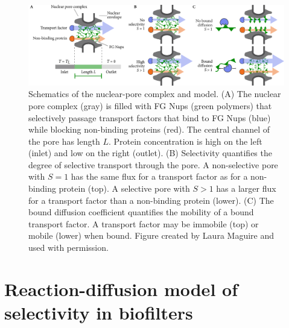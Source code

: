 \begin{figure}[!t]
  \begin{center}
    \includegraphics[width=150mm]{figs/ch03_bio/bio_cartoon.pdf}
  \end{center}
	\caption[NPC model schematic]
  {Schematics of the nuclear-pore complex and model. (A) The
  nuclear pore complex (gray) is filled with FG Nups (green polymers)
  that selectively passage transport factors that bind to FG Nups
  (blue) while blocking non-binding proteins (red). The central
  channel of the pore has length $L$. Protein concentration is high on
  the left (inlet) and low on the right (outlet).  (B) Selectivity
  quantifies the degree of selective transport through the pore. A
  non-selective pore with $S=1$ has the same flux for a transport
  factor as for a non-binding protein (top). A selective pore with
  $S>1$ has a larger flux for a transport factor than a non-binding
  protein (lower). (C) The bound diffusion coefficient quantifies the
  mobility of a bound transport factor.  A transport factor may be
  immobile (top) or mobile (lower) when bound. Figure created by Laura Maguire
  and used with permission.}\label{fig:bio_cartoon}
\end{figure}

\section{Reaction-diffusion model of selectivity in biofilters}

